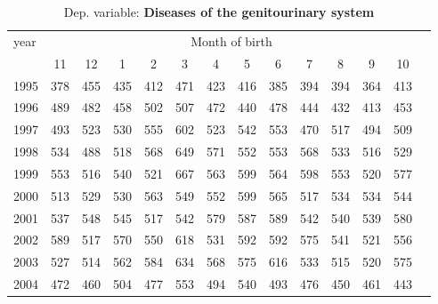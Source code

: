  \begin{table}[H] \begin{threeparttable} \centering \caption{Dep. variable: \textbf{Diseases of the genitourinary system}} {\def\sym#1{\ifmmode^{#1}\else\(^{#1}\)\fi} \begin{tabular}{l*{13}{c}} \toprule year & \multicolumn{12}{c}{Month of birth} \\ \cmidrule(lr){2-13} 
            &          11&          12&           1&           2&           3&           4&           5&           6&           7&           8&           9&          10\\
1995        &         378&         455&         435&         412&         471&         423&         416&         385&         394&         394&         364&         413\\
1996        &         489&         482&         458&         502&         507&         472&         440&         478&         444&         432&         413&         453\\
1997        &         493&         523&         530&         555&         602&         523&         542&         553&         470&         517&         494&         509\\
1998        &         534&         488&         518&         568&         649&         571&         552&         553&         568&         533&         516&         529\\
1999        &         553&         516&         540&         521&         667&         563&         599&         564&         598&         553&         520&         577\\
2000        &         513&         529&         530&         563&         549&         552&         599&         565&         517&         534&         534&         544\\
2001        &         537&         548&         545&         517&         542&         579&         587&         589&         542&         540&         539&         580\\
2002        &         589&         517&         570&         550&         618&         531&         592&         592&         575&         541&         521&         556\\
2003        &         527&         514&         562&         584&         634&         568&         575&         616&         533&         515&         520&         575\\
2004        &         472&         460&         504&         477&         553&         494&         540&         493&         476&         450&         461&         443\\

\end{tabular}}
\end{threeparttable}
\end{table}
